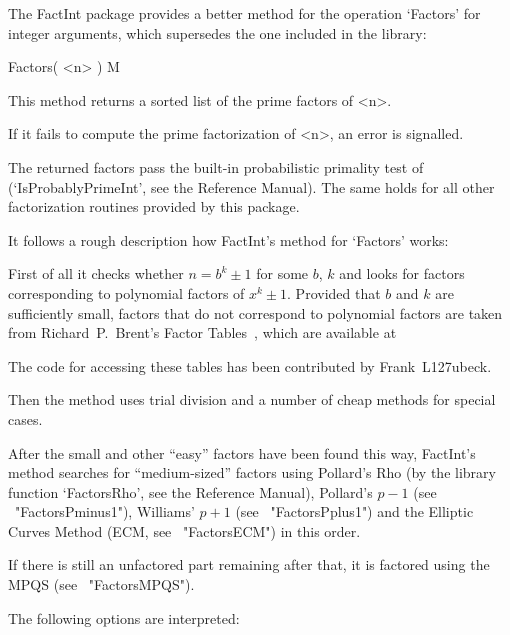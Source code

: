 

The {\sf FactInt} package provides a better method for the operation
`Factors' for integer arguments, which supersedes the one included in
the {\GAP} library:

\>Factors( <n> ) M

This method returns a sorted list of the prime factors of <n>.

If it fails to compute the prime factorization of <n>, an error is
signalled.

The returned factors pass the built-in probabilistic primality test of
{\GAP} (`IsProbablyPrimeInt', see the {\GAP} Reference Manual).
The same holds for all other factorization routines provided by this
package.

It follows a rough description how {\sf FactInt}'s method for `Factors'
works:

First of all it checks whether $n = b^k \pm 1$ for some $b$, $k$ and
looks for factors corresponding to polynomial factors of $x^k \pm 1$.
Provided that $b$ and $k$ are sufficiently small, factors that do not
correspond to polynomial factors are taken from Richard~P.~Brent's
Factor Tables~\cite{Brent04}, which are available at


The code for accessing these tables has been contributed by
Frank~L\accent127ubeck.

Then the method uses trial division and a number of cheap methods for
special cases.

After the small and other ``easy'' factors have been found this way,
{\sf FactInt}'s method searches for ``medium-sized'' factors using
Pollard's Rho (by the library function `FactorsRho', see the {\GAP}
Reference Manual), Pollard's $p-1$ (see ~"FactorsPminus1"),
Williams' $p+1$ (see ~"FactorsPplus1") and the Elliptic Curves Method
(ECM, see ~"FactorsECM") in this order.

If there is still an unfactored part remaining after that,
it is factored using the MPQS (see ~"FactorsMPQS").

The following options are interpreted:

